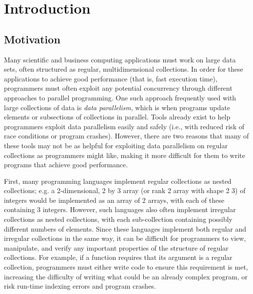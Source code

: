 \chapter{Introduction}

\section{Motivation}
Many scientific and business computing applications must work on large data sets,  
often structured as regular, multidimensional collections.
In order for these applications to achieve good performance (that is, fast execution time), 
programmers must often exploit any potential concurrency through different approaches to parallel programming.
One such approach frequently used with large collections of data is \textit{data parallelism}, 
which is when programs update elements or subsections of collections in parallel.
Tools already exist to help programmers exploit data parallelism 
easily and safely (i.e., with reduced risk of race conditions or program crashes)\cite{dph}\cite{openmp}. 
However, there are two reasons that many of these tools may not be as helpful 
for exploiting data parallelism on regular collections as programmers might like, 
making it more difficult for them to write programs that achieve good performance.

First, many programming languages implement regular collections as nested collections;
e.g. a 2-dimensional, 2 by 3 array (or rank 2 array with shape 2 3) of integers would be implemented as 
an array of 2 arrays, with each of these containing 3 integers. 
However, such languages also often implement irregular collections as nested collections, 
with each sub-collection containing possibly different numbers of elements.
Since these languages implement both regular and irregular collections in the same way,
it can be difficult for programmers to view, manipulate, and verify 
any important properties of the structure of regular collections.
For example, if a function requires that its argument is a regular collection, 
programmers must either write code to ensure this requirement is met,
increasing the difficulty of writing what could be an already complex program, 
or risk run-time indexing errors and program crashes.

